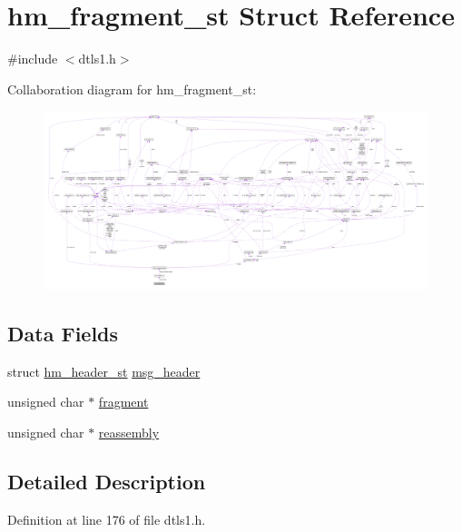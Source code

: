 \hypertarget{structhm__fragment__st}{}\section{hm\+\_\+fragment\+\_\+st Struct Reference}
\label{structhm__fragment__st}


{\ttfamily \#include $<$dtls1.\+h$>$}



Collaboration diagram for hm\+\_\+fragment\+\_\+st\+:\nopagebreak
\begin{figure}[H]
\begin{center}
\leavevmode
\includegraphics[width=350pt]{structhm__fragment__st__coll__graph}
\end{center}
\end{figure}
\subsection*{Data Fields}
\begin{DoxyCompactItemize}
\item 
struct \hyperlink{structhm__header__st}{hm\+\_\+header\+\_\+st} \hyperlink{structhm__fragment__st_a7bca8bef88f269e9afece0be547478b2}{msg\+\_\+header}
\item 
unsigned char $\ast$ \hyperlink{structhm__fragment__st_a0a362b34ba3097260f0abf68ff25f03a}{fragment}
\item 
unsigned char $\ast$ \hyperlink{structhm__fragment__st_acee83a8b519b7df1797ab14a8cf805b0}{reassembly}
\end{DoxyCompactItemize}


\subsection{Detailed Description}


Definition at line 176 of file dtls1.\+h.



